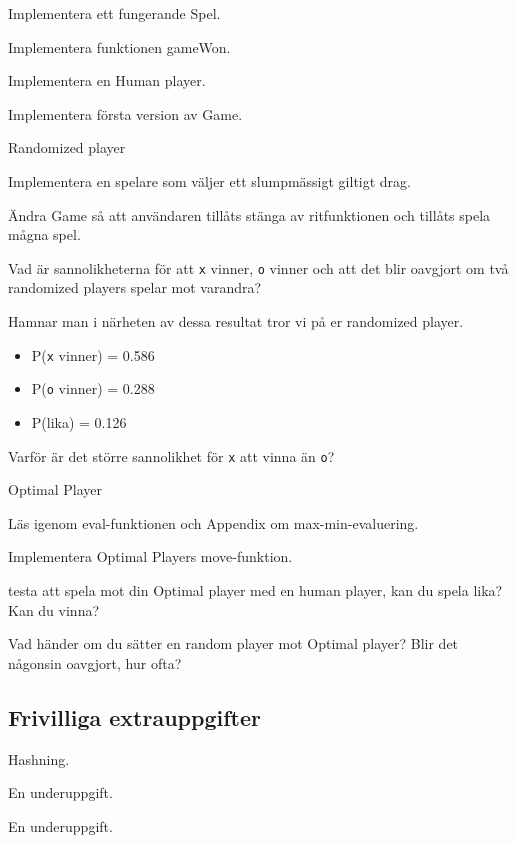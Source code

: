 \Task Implementera ett fungerande Spel.

\Subtask Implementera funktionen gameWon.

\Subtask Implementera en Human player.

\Subtask Implementera första version av Game.

\Task Randomized player

\Subtask Implementera en spelare som väljer ett slumpmässigt giltigt drag.

\Subtask Ändra Game så att användaren tillåts stänga av ritfunktionen och tillåts spela mågna spel.

\Subtask Vad är sannolikheterna för att \texttt{x} vinner, \texttt{o} vinner och att det blir oavgjort om två randomized players spelar mot varandra?

Hamnar man i närheten av dessa resultat tror vi på er randomized player.
\begin{itemize}
	\item P(\texttt{x} vinner) = 0.586
	\item P(\texttt{o} vinner) = 0.288
	\item P(lika) = 0.126
\end{itemize}


\Subtask Varför är det större sannolikhet för \texttt{x} att vinna än \texttt{o}?

\Task Optimal Player

\Subtask Läs igenom eval-funktionen och Appendix om max-min-evaluering.

\Subtask Implementera Optimal Players move-funktion.

\Subtask testa att spela mot din Optimal player med en human player, kan du spela lika? Kan du vinna?

\Subtask Vad händer om du sätter en random player mot Optimal player? Blir det någonsin oavgjort, hur ofta?

\subsection{Frivilliga extrauppgifter}

\Task Hashning.

\Subtask En underuppgift.

\Subtask En underuppgift.